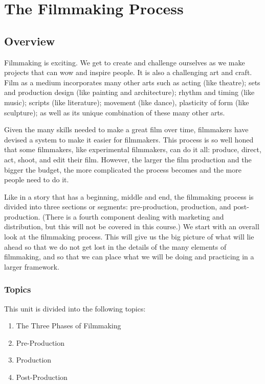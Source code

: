 \documentclass[
]{book}
\providecommand{\tightlist}{%
  \setlength{\itemsep}{0pt}\setlength{\parskip}{0pt}}
\begin{document}
\hypertarget{the-filmmaking-process}{%
\chapter{The Filmmaking Process}\label{the-filmmaking-process}}

\hypertarget{overview-1}{%
\section*{Overview}\label{overview-1}}

Filmmaking is exciting. We get to create and challenge ourselves as we make projects that can wow and inspire people. It is also a challenging art and craft. Film as a medium incorporates many other arts such as acting (like theatre); sets and production design (like painting and architecture); rhythm and timing (like music); scripts (like literature); movement (like dance), plasticity of form (like sculpture); as well as its unique combination of these many other arts.

Given the many skills needed to make a great film over time, filmmakers have devised a system to make it easier for filmmakers. This process is so well honed that some filmmakers, like experimental filmmakers, can do it all: produce, direct, act, shoot, and edit their film. However, the larger the film production and the bigger the budget, the more complicated the process becomes and the more people need to do it.

Like in a story that has a beginning, middle and end, the filmmaking process is divided into three sections or segments: pre-production, production, and post-production. (There is a fourth component dealing with marketing and distribution, but this will not be covered in this course.) We start with an overall look at the filmmaking process. This will give us the big picture of what will lie ahead so that we do not get lost in the details of the many elements of filmmaking, and so that we can place what we will be doing and practicing in a larger framework.

\hypertarget{topics-1}{%
\subsection*{Topics}\label{topics-1}}

This unit is divided into the following topics:

\begin{enumerate}
\def\labelenumi{\arabic{enumi}.}
\tightlist
\item
  The Three Phases of Filmmaking\\
\item
  Pre-Production\\
\item
  Production\\
\item
  Post-Production
\end{enumerate}
\end{document}

